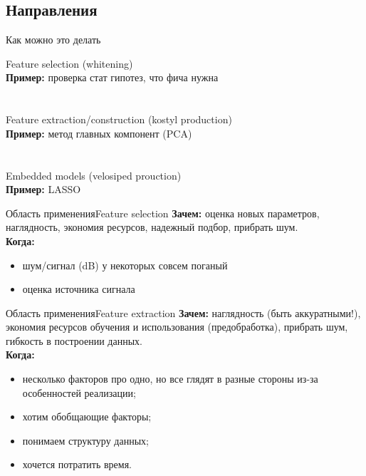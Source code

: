 \documentclass[14pt, fleqn, xcolor={dvipsnames, table}]{beamer}
\begin{document}
\subsection{Направления}
\begin{frame}{Как можно это делать}{}

{\color{blue}Feature selection (whitening)} \\
\textbf{Пример:} проверка стат гипотез, что фича нужна \\
 \\
~\\
{\color{blue}Feature extraction/construction (kostyl production)} \\
\textbf{Пример:} метод главных компонент (PCA) \\
 \\
~\\
{\color{blue}Embedded models (velosiped prouction)}\\
\textbf{Пример:} LASSO \\
\end{frame}

\begin{frame}{Область применения}{Feature selection}
\textbf{Зачем:} оценка новых параметров, наглядность, экономия ресурсов, надежный подбор, прибрать шум. \\
\textbf{Когда:}
\begin{itemize}
  \item шум/сигнал (dB) у некоторых совсем поганый
  \item оценка источника сигнала
\end{itemize}
\end{frame}

\begin{frame}{Область применения}{Feature extraction}
\textbf{Зачем:} наглядность (быть аккуратными!), экономия ресурсов обучения и использования (предобработка), прибрать шум, гибкость в построении данных. \\
\textbf{Когда:}
\begin{itemize}
  \item несколько факторов про одно, но все глядят в разные стороны из-за особенностей реализации;
  \item хотим обобщающие факторы;
  \item понимаем структуру данных;
  \item хочется потратить время.
\end{itemize}
\end{frame}
\end{document}
